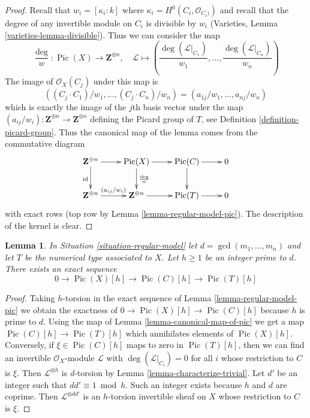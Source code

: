 \documentclass{stacks-project}
\theoremstyle{plain}
\newtheorem{lemma}[subsection]{Lemma}
\theoremstyle{definition}
\theoremstyle{remark}
\numberwithin{equation}{subsection}
\def\Pic{\mathop{\mathrm{Pic}}\nolimits}
\begin{document}
\begin{proof}
Recall that $w_i = [\kappa_i : k]$ where
$\kappa_i = H^0(C_i, \mathcal{O}_{C_i)})$ and recall
that the degree of any invertible module on $C_i$ is divisible
by $w_i$ (Varieties, Lemma \ref{varieties-lemma-divisible}).
Thus we can consider the map
$$
\frac{\deg}{w} : \Pic(X) \to \mathbf{Z}^{\oplus n}, \quad
\mathcal{L} \mapsto
(\frac{\deg(\mathcal{L}|_{C_1})}{w_1}, \ldots,
\frac{\deg(\mathcal{L}|_{C_n})}{w_n})
$$
The image of $\mathcal{O}_X(C_j)$ under this map is
$$
((C_j \cdot C_1)/w_1, \ldots, (C_j \cdot C_n)/w_n) =
(a_{1j}/w_1, \ldots, a_{nj}/w_n)
$$
which is exactly the image of the $j$th basis vector under the map
$(a_{ij}/w_i) : \mathbf{Z}^{\oplus n} \to \mathbf{Z}^{\oplus n}$
defining the Picard group of $T$, see
Definition \ref{definition-picard-group}.
Thus the canonical map of the lemma comes from the commutative
diagram
$$
\xymatrix{
\mathbf{Z}^{\oplus n} \ar[r] \ar[d]_{\text{id}} &
\Pic(X) \ar[r] \ar[d]^{\frac{\deg}{w}} &
\Pic(C) \ar[r] \ar[d] & 0 \\
\mathbf{Z}^{\oplus n} \ar[r]^{(a_{ij}/w_i)} &
\mathbf{Z}^{\oplus n} \ar[r] &
\Pic(T) \ar[r] & 0
}
$$
with exact rows (top row by Lemma \ref{lemma-regular-model-pic}).
The description of the kernel is clear.
\end{proof}

\begin{lemma}
\label{lemma-sequence-torsion}
In Situation \ref{situation-regular-model} let $d = \gcd(m_1, \ldots, m_n)$
and let $T$ be the numerical type associated to $X$.
Let $h \geq 1$ be an integer prime to $d$. There exists an exact sequence
$$
0 \to \Pic(X)[h] \to \Pic(C)[h] \to \Pic(T)[h]
$$
\end{lemma}

\begin{proof}
Taking $h$-torsion in the exact sequence of
Lemma \ref{lemma-regular-model-pic}
we obtain the exactness of
$0 \to \Pic(X)[h] \to \Pic(C)[h]$
because $h$ is prime to $d$.
Using the map of Lemma \ref{lemma-canonical-map-of-pic}
we get a map $\Pic(C)[h] \to \Pic(T)[h]$
which annihilates elements of $\Pic(X)[h]$.
Conversely, if $\xi \in \Pic(C)[h]$
maps to zero in $\Pic(T)[h]$, then we can find
an invertible $\mathcal{O}_X$-module $\mathcal{L}$
with $\deg(\mathcal{L}|_{C_i}) = 0$ for all $i$
whose restriction to $C$ is $\xi$.
Then $\mathcal{L}^{\otimes h}$ is $d$-torsion by
Lemma \ref{lemma-characterize-trivial}.
Let $d'$ be an integer such that $dd' \equiv 1 \bmod h$.
Such an integer exists because $h$ and $d$ are coprime.
Then $\mathcal{L}^{\otimes dd'}$ is an $h$-torsion
invertible sheaf on $X$ whose restriction to $C$ is $\xi$.
\end{proof}
\end{document}
